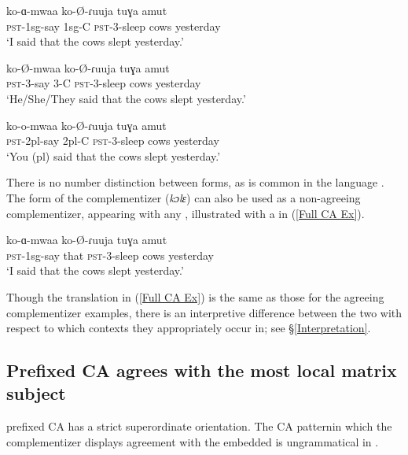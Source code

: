 \documentclass[output=paper
,newtxmath
,modfonts
,nonflat]{langsci/langscibook}
\begin{document}
\ea \label{Agreeing C Paradigm}
\begin{xlist} 

\ex
\gll	ko-ɑ-mwaa  ko-\O-ɾuuja tuɣa amut \\
\textsc{pst}-1sg-say 1sg-C \textsc{pst}-3-sleep cows yesterday \\
\glt `I said that the cows slept yesterday.'

\ex  \label{Agreeing 3rd}
\gll ko-\O-mwaa  ko-\O-ɾuuja tuɣa amut \\
\textsc{pst}-3-say 3-C \textsc{pst}-3-sleep cows yesterday \\
\glt `He/She/They said that the cows slept yesterday.'
    	
\ex
\gll ko-o-mwaa  ko-\O-ɾuuja tuɣa amut \\
\textsc{pst}-2pl-say 2pl-C \textsc{pst}-3-sleep cows yesterday \\
\glt `You (pl) said that the cows slept yesterday.'

\end{xlist}
\z

\noindent There is no number distinction between  forms, as is common in the language \citep[see][]{Jake:1979, Toweett:1979}. The  form of the complementizer (\textit{kɔlɛ}) can also be used as a non-agreeing complementizer, appearing with any , illustrated with a   in (\ref{Full CA Ex}). 

\ea \label{Full CA Ex}
\gll	ko-ɑ-mwaa  ko-\O-ɾuuja tuɣa amut \\
\textsc{pst}-1sg-say that \textsc{pst}-3-sleep cows yesterday \\
\glt `I said that the cows slept yesterday.'

\z

\noindent Though the translation in (\ref{Full CA Ex}) is the same as those for the agreeing complementizer examples, there is an interpretive difference between the two with respect to which contexts they appropriately occur in; see \S \ref{Interpretation}.

\subsection{Prefixed CA agrees with the most local matrix subject} 

 prefixed CA has a strict superordinate  orientation. The  CA pattern\textemdash in which the complementizer displays agreement with the embedded \textemdash is ungrammatical in . 
\end{document}
